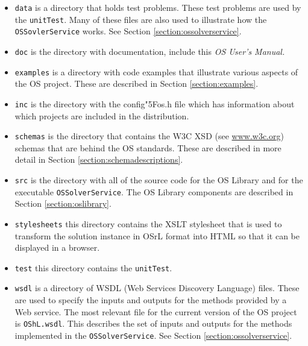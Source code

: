 \documentclass[11pt]{article}
\renewcommand{\_}{{\char"5F}}
\renewcommand{\{}{{\char"7B}}
\renewcommand{\}}{{\char"7D}}
\renewcommand{\^}{{\char"0D}}
\renewcommand{\'}{{\char"0D}}
\begin{document}
\begin{itemize}

\item {\tt data} is a directory that holds test problems. These test problems are used by the {\tt unitTest}. Many of these files are also used to illustrate how the {\tt OSSovlerService} works. See Section \ref{section:ossolverservice}.

\item {\tt doc} is the directory with documentation, include this {\it OS User's Manual.}

\item {\tt examples} is a directory with code examples that illustrate various aspects of the OS project.    These are described in Section \ref{section:examples}.

\item {\tt inc} is the directory with the config\_os.h file which has information about which projects are included in the distribution.

\item {\tt schemas} is the directory that contains the W3C XSD (see \url{www.w3c.org}) schemas that are behind the OS standards. These are described in more detail in Section \ref{section:schemadescriptions}.

\item {\tt src} is the directory with all of the source code for the OS Library and for the executable {\tt OSSolverService}. The OS Library components are described in Section \ref{section:oslibrary}.

\item {\tt stylesheets} this directory contains the XSLT stylesheet that is used to transform the solution instance in OSrL format into HTML so that it can be displayed in a browser.

\item {\tt test} this directory contains the {\tt unitTest}.


\item  {\tt wsdl} is a directory of WSDL (Web Services Discovery Language) files. These are used to specify the inputs and outputs for the methods provided by a Web service. The most relevant file for the current version of the OS project is {\tt OShL.wsdl}.  This describes the set of inputs and outputs for the methods implemented in the {\tt OSSolverService}. See Section \ref{section:ossolverservice}.
\end{itemize}
\end{document}
